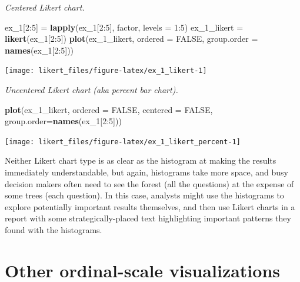 \documentclass[]{book}
\newenvironment{Shaded}{\begin{snugshade}}{\end{snugshade}}
\newcommand{\KeywordTok}[1]{\textcolor[rgb]{0.13,0.29,0.53}{\textbf{{#1}}}}
\newcommand{\DataTypeTok}[1]{\textcolor[rgb]{0.13,0.29,0.53}{{#1}}}
\newcommand{\DecValTok}[1]{\textcolor[rgb]{0.00,0.00,0.81}{{#1}}}
\newcommand{\StringTok}[1]{\textcolor[rgb]{0.31,0.60,0.02}{{#1}}}
\newcommand{\OtherTok}[1]{\textcolor[rgb]{0.56,0.35,0.01}{{#1}}}
\newcommand{\NormalTok}[1]{{#1}}
\begin{document}
\emph{Centered Likert chart.}

\begin{Shaded}
\begin{Highlighting}[]
\NormalTok{ex_1[}\DecValTok{2}\NormalTok{:}\DecValTok{5}\NormalTok{] =}\StringTok{ }\KeywordTok{lapply}\NormalTok{(ex_1[}\DecValTok{2}\NormalTok{:}\DecValTok{5}\NormalTok{], factor, }\DataTypeTok{levels =} \DecValTok{1}\NormalTok{:}\DecValTok{5}\NormalTok{)}
\NormalTok{ex_1_likert =}\StringTok{ }\KeywordTok{likert}\NormalTok{(ex_1[}\DecValTok{2}\NormalTok{:}\DecValTok{5}\NormalTok{])}
\KeywordTok{plot}\NormalTok{(ex_1_likert, }\DataTypeTok{ordered =} \OtherTok{FALSE}\NormalTok{, }\DataTypeTok{group.order =} \KeywordTok{names}\NormalTok{(ex_1[}\DecValTok{2}\NormalTok{:}\DecValTok{5}\NormalTok{]))}
\end{Highlighting}
\end{Shaded}

\begin{center}\texttt{[image: likert\_files/figure-latex/ex\_1\_likert-1]} \end{center}

\emph{Uncentered Likert chart (aka percent bar chart).}

\begin{Shaded}
\begin{Highlighting}[]
\KeywordTok{plot}\NormalTok{(ex_1_likert, }\DataTypeTok{ordered =} \OtherTok{FALSE}\NormalTok{, }\DataTypeTok{centered =} \OtherTok{FALSE}\NormalTok{, }\DataTypeTok{group.order=}\KeywordTok{names}\NormalTok{(ex_1[}\DecValTok{2}\NormalTok{:}\DecValTok{5}\NormalTok{]))}
\end{Highlighting}
\end{Shaded}

\begin{center}\texttt{[image: likert\_files/figure-latex/ex\_1\_likert\_percent-1]} \end{center}

Neither Likert chart type is as clear as the histogram at making the
results immediately understandable, but again, histograms take more
space, and busy decision makers often need to see the forest (all the
questions) at the expense of some trees (each question). In this case,
analysts might use the histograms to explore potentially important
results themselves, and then use Likert charts in a report with some
strategically-placed text highlighting important patterns they found
with the histograms.

\section{Other ordinal-scale
visualizations}\label{other-ordinal-scale-visualizations}
\end{document}
